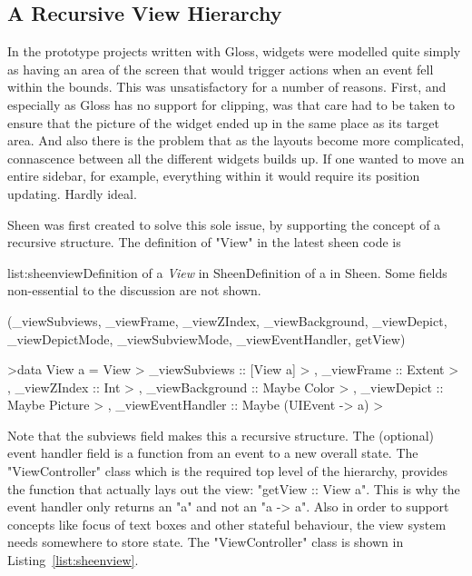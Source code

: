 \subsection{A Recursive View Hierarchy}

In the prototype projects written with Gloss, widgets were modelled quite simply as having an area of the screen that would trigger actions when an event fell within the bounds. This was unsatisfactory  for a number of reasons. First, and especially as Gloss has no support for clipping, was that care had to be taken to ensure that the picture of the widget ended up in the same place as its target area. And also there is the problem that as the layouts become more complicated, connascence between all the different widgets builds up. If one wanted to move an entire sidebar, for example, everything within it would require its position updating. Hardly ideal.

Sheen was first created to solve this sole issue, by supporting the concept of a recursive structure. The definition of "View" in the latest sheen code is

\vspace{-0.5em}
\begin{listing}{list:sheenview}{Definition of a \emph{View} in Sheen}{Definition of a  in Sheen. Some fields non-essential to the discussion are not shown.}{}
\end{listing}\vspace{-1.5em}

\functions(_viewSubviews, _viewFrame, _viewZIndex, _viewBackground, _viewDepict, _viewDepictMode, _viewSubviewMode, _viewEventHandler, getView)
\begin{haskell}

>data View a = View
>  {  _viewSubviews     :: [View a]
>  ,  _viewFrame        :: Extent
>  ,  _viewZIndex       :: Int
>  ,  _viewBackground   :: Maybe Color
>  ,  _viewDepict       :: Maybe Picture
>  ,  _viewEventHandler :: Maybe (UIEvent -> a)
>  }

\end{haskell}
\noindent 
Note that the subviews field makes this a recursive structure. The (optional) event handler field is a function from an event to a new overall state. The "ViewController" class which is the required top level of the hierarchy, provides the function that actually lays out the view: "getView :: View a". This is why the event handler only returns an "a" and not an "a -> a".
Also in order to support concepts like focus of text boxes and other stateful behaviour, the view system needs somewhere to store state. The "ViewController" class is shown in Listing~\ref{list:sheenview}.

